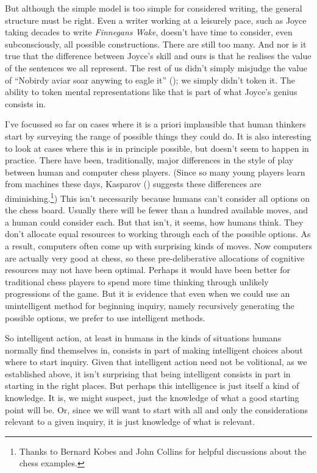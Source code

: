 \documentclass[
  11pt,
  letterpaper,
  DIV=11,
  numbers=noendperiod,
  twoside]{scrartcl}
\begin{document}
But although the simple model is too simple for considered writing, the
general structure must be right. Even a writer working at a leisurely
pace, such as Joyce taking decades to write \emph{Finnegans Wake},
doesn't have time to consider, even subconsciously, all possible
constructions. There are still too many. And nor is it true that the
difference between Joyce's skill and ours is that he realises the value
of the sentences we all represent. The rest of us didn't simply misjudge
the value of ``Nobirdy aviar soar anywing to eagle it''
(); we simply didn't token
it. The ability to token mental representations like that is part of
what Joyce's genius consists in.

I've focussed so far on cases where it is a priori implausible that
human thinkers start by surveying the range of possible things they
could do. It is also interesting to look at cases where this is in
principle possible, but doesn't seem to happen in practice. There have
been, traditionally, major differences in the style of play between
human and computer chess players. (Since so many young players learn
from machines these days, Kasparov ()
suggests these differences are diminishing.\footnote{Thanks to Bernard
  Kobes and John Collins for helpful discussions about the chess
  examples.}) This isn't necessarily because humans can't consider all
options on the chess board. Usually there will be fewer than a hundred
available moves, and a human could consider each. But that isn't, it
seems, how humans think. They don't allocate equal resources to working
through each of the possible options. As a result, computers often come
up with surprising kinds of moves. Now computers are actually very good
at chess, so these pre-deliberative allocations of cognitive resources
may not have been optimal. Perhaps it would have been better for
traditional chess players to spend more time thinking through unlikely
progressions of the game. But it is evidence that even when we could use
an unintelligent method for beginning inquiry, namely recursively
generating the possible options, we prefer to use intelligent methods.

So intelligent action, at least in humans in the kinds of situations
humans normally find themselves in, consists in part of making
intelligent choices about where to start inquiry. Given that intelligent
action need not be volitional, as we established above, it isn't
surprising that being intelligent consists in part in starting in the
right places. But perhaps this intelligence is just itself a kind of
knowledge. It is, we might suspect, just the knowledge of what a good
starting point will be. Or, since we will want to start with all and
only the considerations relevant to a given inquiry, it is just
knowledge of what is relevant.
\end{document}
